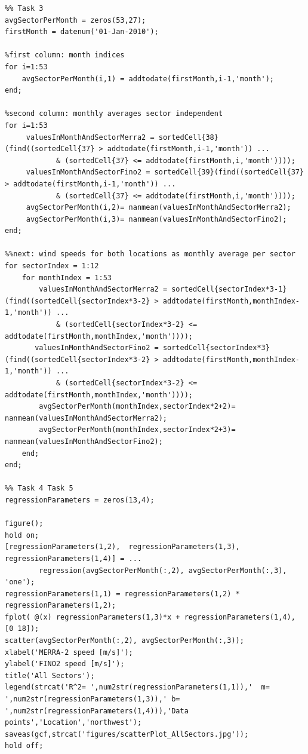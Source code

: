 \documentclass[10pt]{article}
\begin{document}
\begin{lstlisting}
%% Task 3
avgSectorPerMonth = zeros(53,27);
firstMonth = datenum('01-Jan-2010');

%first column: month indices
for i=1:53
    avgSectorPerMonth(i,1) = addtodate(firstMonth,i-1,'month');
end;

%second column: monthly averages sector independent
for i=1:53
     valuesInMonthAndSectorMerra2 = sortedCell{38}(find((sortedCell{37} > addtodate(firstMonth,i-1,'month')) ...
            & (sortedCell{37} <= addtodate(firstMonth,i,'month'))));
     valuesInMonthAndSectorFino2 = sortedCell{39}(find((sortedCell{37} > addtodate(firstMonth,i-1,'month')) ...
            & (sortedCell{37} <= addtodate(firstMonth,i,'month'))));
     avgSectorPerMonth(i,2)= nanmean(valuesInMonthAndSectorMerra2);
     avgSectorPerMonth(i,3)= nanmean(valuesInMonthAndSectorFino2);
end;

%%next: wind speeds for both locations as monthly average per sector
for sectorIndex = 1:12
    for monthIndex = 1:53
        valuesInMonthAndSectorMerra2 = sortedCell{sectorIndex*3-1}(find((sortedCell{sectorIndex*3-2} > addtodate(firstMonth,monthIndex-1,'month')) ...
            & (sortedCell{sectorIndex*3-2} <= addtodate(firstMonth,monthIndex,'month'))));
       valuesInMonthAndSectorFino2 = sortedCell{sectorIndex*3}(find((sortedCell{sectorIndex*3-2} > addtodate(firstMonth,monthIndex-1,'month')) ...
            & (sortedCell{sectorIndex*3-2} <= addtodate(firstMonth,monthIndex,'month'))));
        avgSectorPerMonth(monthIndex,sectorIndex*2+2)= nanmean(valuesInMonthAndSectorMerra2);
        avgSectorPerMonth(monthIndex,sectorIndex*2+3)= nanmean(valuesInMonthAndSectorFino2);
    end;
end;

%% Task 4 Task 5
regressionParameters = zeros(13,4);

figure();
hold on;
[regressionParameters(1,2),  regressionParameters(1,3), regressionParameters(1,4)] = ... 
        regression(avgSectorPerMonth(:,2), avgSectorPerMonth(:,3), 'one');
regressionParameters(1,1) = regressionParameters(1,2) * regressionParameters(1,2);
fplot( @(x) regressionParameters(1,3)*x + regressionParameters(1,4), [0 18]);
scatter(avgSectorPerMonth(:,2), avgSectorPerMonth(:,3));
xlabel('MERRA-2 speed [m/s]');
ylabel('FINO2 speed [m/s]');
title('All Sectors');
legend(strcat('R^2= ',num2str(regressionParameters(1,1)),'  m= ',num2str(regressionParameters(1,3)),' b= ',num2str(regressionParameters(1,4))),'Data points','Location','northwest');
saveas(gcf,strcat('figures/scatterPlot_AllSectors.jpg'));
hold off;


\end{lstlisting}
\end{document}
